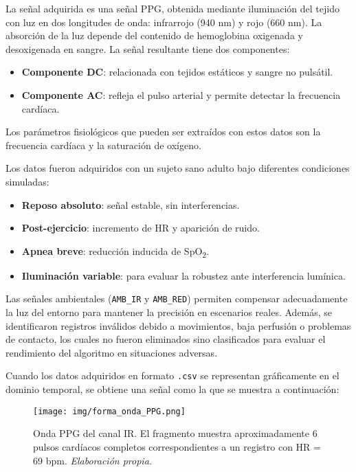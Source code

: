 La señal adquirida es una señal PPG, obtenida mediante iluminación del tejido con luz en dos longitudes de onda: infrarrojo (940 nm) y rojo (660 nm). La absorción de la luz depende del contenido de hemoglobina oxigenada y desoxigenada en sangre. La señal resultante tiene dos componentes:

\begin{itemize}
  \item \textbf{Componente DC}: relacionada con tejidos estáticos y sangre no pulsátil.
  \item \textbf{Componente AC}: refleja el pulso arterial y permite detectar la frecuencia cardíaca.
\end{itemize}

Los parámetros fisiológicos que pueden ser extraídos con estos datos son la frecuencia cardíaca y la saturación de oxígeno.

Los datos fueron adquiridos con un sujeto sano adulto bajo diferentes condiciones simuladas:

\begin{itemize}
  \item \textbf{Reposo absoluto}: señal estable, sin interferencias.
  \item \textbf{Post-ejercicio}: incremento de HR y aparición de ruido.
  \item \textbf{Apnea breve}: reducción inducida de SpO\textsubscript{2}.
  \item \textbf{Iluminación variable}: para evaluar la robustez ante interferencia lumínica.
\end{itemize}

Las señales ambientales (\texttt{AMB\_IR} y \texttt{AMB\_RED}) permiten compensar adecuadamente la luz del entorno para mantener la precisión en escenarios reales. Además, se identificaron registros inválidos debido a movimientos, baja perfusión o problemas de contacto, los cuales no fueron eliminados sino clasificados para evaluar el rendimiento del algoritmo en situaciones adversas.

Cuando los datos adquiridos en formato \texttt{.csv} se representan gráficamente en el dominio temporal, se obtiene una señal como la que se muestra a continuación:

\begin{figure}[H]
    \centering
    \texttt{[image: img/forma\_onda\_PPG.png]}
    \caption{Onda PPG del canal IR. El fragmento muestra aproximadamente 6 pulsos cardíacos completos correspondientes a un registro con HR = 69 bpm. \textit{Elaboración propia.}}
    \label{fig:ppg_morfologia}
\end{figure}

